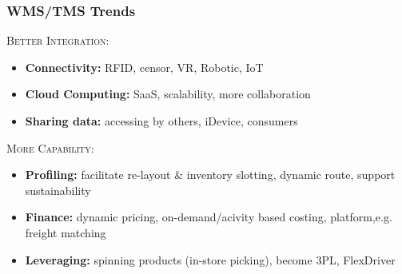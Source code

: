 \documentclass[10pt,handout,notes=show]{beamer}
\begin{document}
\begin{frame}
  \frametitle{WMS/TMS Trends}

    \textsc{Better Integration:}
     \begin{itemize}
      \item \textbf{Connectivity:} RFID, \alert{censor}, VR, Robotic, IoT
      \item \textbf{Cloud Computing:}  SaaS, scalability, more collaboration
      \item \textbf{Sharing data:} accessing by others, iDevice, \alert{consumers}
    \end{itemize}

    \NextLine
    \textsc{More Capability:}
    \begin{itemize}
      \item \textbf{Profiling:} \alert{facilitate} re-layout \& inventory slotting, dynamic route, support sustainability
      \item \textbf{Finance:} dynamic pricing, on-demand/acivity based costing, platform,e.g. freight matching
      \item \textbf{Leveraging:} spinning products (in-store picking), become 3PL, FlexDriver
    \end{itemize}

\end{frame}

%
%
%
%
\end{document}
